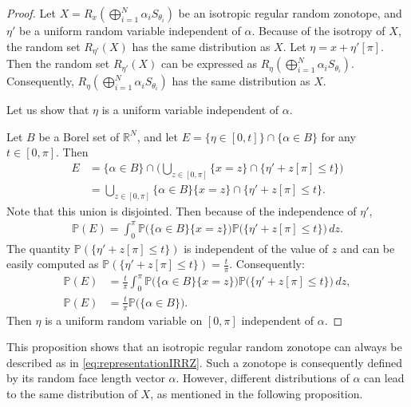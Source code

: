 \documentclass[numbers,compress,v1.0.1]{vmsta}
\theoremstyle{definition}
\begin{document}
\begin{proof}
Let $ X=R_x(\bigoplus_{i=1}^N\alpha_i S_{\theta_i})$ be an isotropic
regular random zonotope, and $\eta'$ be a uniform random variable
independent of $\alpha$. Because of the isotropy of $X$, the random set
$R_{\eta'}(X)$ has the same distribution as $X$. Let $\eta=x+\eta'[\pi]
$. Then the random set $R_{\eta'}(X)$ can be expressed as $R_{\eta
}(\bigoplus_{i=1}^N\alpha_i S_{\theta_i})$. Consequently, $R_{\eta
}(\bigoplus_{i=1}^N\alpha_i S_{\theta_i})$ has the same distribution as $X$.

Let us show that $\eta$ is a uniform variable independent of $\alpha$.

Let $B$ be a Borel set of $\mathbb{R}^N$, and let $E=\lbrace\eta\in
[0,t]\rbrace\cap\lbrace\alpha\in B\rbrace$ for any $t\in[0,\pi]$. Then
%
\begin{align*}
E &= \lbrace\alpha\in B\rbrace\cap\biggl(\bigcup_{z\in[0,\pi]}
\lbrace x=z\rbrace\cap\bigl\lbrace\eta'+z[\pi]\leq t\bigr\rbrace
\biggr)
\\
&=\bigcup_{z\in[0,\pi]} \lbrace\alpha\in B\rbrace \lbrace
x=z\rbrace\cap \bigl\lbrace\eta'+z[\pi]\leq t\bigr\rbrace.
\end{align*}
%
Note that this union is disjointed. Then because of the independence of
$\eta'$,
%
\begin{align*}
\mathbb{P}(E)=\int_0^\pi\mathbb{P}\bigl(
\lbrace\alpha\in B\rbrace \lbrace x=z\rbrace\bigr)\mathbb{P}\bigl( \bigl\lbrace
\eta'+z[\pi]\leq t\bigr\rbrace\bigr)\,dz.
\end{align*}
%
The quantity $\mathbb{P}( \lbrace\eta'+z[\pi]\leq t\rbrace)$ is
independent of the value of $z$ and can be easily computed as $\mathbb
{P}( \lbrace\eta'+z[\pi]\leq t\rbrace)=\frac{t}{\pi}$. Consequently:
%
\begin{align*}
\mathbb{P}(E)&=\frac{t}{\pi}\int_0^\pi
\mathbb{P}\bigl( \lbrace\alpha\in B\rbrace \lbrace x=z\rbrace\bigr)\mathbb{P}
\bigl( \bigl\lbrace\eta'+z[\pi]\leq t\bigr\rbrace \bigr)\,dz,
\\
\mathbb{P}(E)&=\frac{t}{\pi}\mathbb{P}\bigl( \lbrace\alpha\in B\rbrace
\bigr).
\end{align*}
%
Then $\eta$ is a uniform random variable on $[0,\pi]$ independent of
$\alpha$.
\end{proof}

This proposition shows that an isotropic regular random zonotope can
always be described as in \eqref{eq:representationIRRZ}. Such a
zonotope is consequently defined by its random face length vector
$\alpha$. However, different distributions of $\alpha$ can lead to the
same distribution of $X$, as mentioned in the following proposition.
\end{document}
